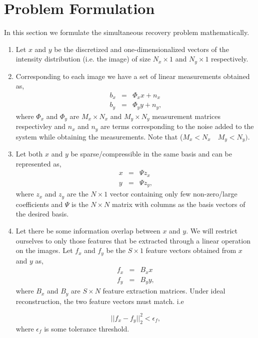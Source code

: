 \chapter{Problem Formulation}
In this section we formulate the simultaneous recovery problem mathematically.
\begin{enumerate}
\item Let $x$ and $y$ be the discretized and one-dimensionalized vectors of the intensity distribution (i.e. the image) of size $N_x \times 1$ and $N_y \times 1$ respectively.
\item Corresponding to each image we have a set of linear measurements obtained as,
 \begin{eqnarray}
  b_x &=& \Phi_x x  + n_x\\
  b_y   &=& \Phi_y y + n_y,
 \end{eqnarray}
where $\Phi_x$ and $\Phi_y$ are $M_x \times N_x$ and $M_y \times N_y$ measurement matrices respectivley and $n_x$ and $n_y$ are terms corresponding to the noise added to the system while obtaining the measurements. Note that ($M_x < N_x \quad  M_y < N_y)$.

\item Let both $x$ and $y$ be sparse/compressible in the same basis and can be represented as,
\begin{eqnarray}
	x &=& \Psi z_x 	\label{eq:domainx}\\
	y &=& \Psi z_y,
	\label{eq:domainy}
\end{eqnarray}
where $z_x$ and $z_y$ are the $N \times 1$ vector containing only few non-zero/large coefficients and $\Psi$ is the  $N \times N$  matrix with columns as the basis vectors of the desired basis. 

\item Let there be some information overlap between $x$ and $y$. We will restrict ourselves to only those features that be extracted through a linear operation on the images. Let $f_x$ and $f_y$ be the $S \times 1$ feature vectors obtained from $x$ and $y$ as,
\begin{eqnarray}
f_x &=& B_x x\\
f_y &=& B_y y,
\end{eqnarray}
where $B_x$ and $B_y$ are $S \times N$ feature extraction matrices.
Under ideal reconstruction, the two feature vectors must match. i.e

\begin{equation}
||f_x - f_y||_2^2 < \epsilon_f,
\end{equation}
where $\epsilon_f$ is some tolerance threshold. 



\end{enumerate}
